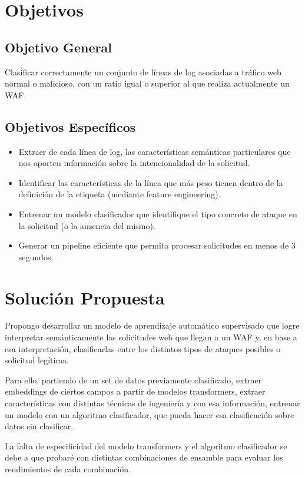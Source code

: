 \documentclass[12pt]{article}
\begin{document}
\section{Objetivos}

\subsection{Objetivo General}
Clasificar correctamente un conjunto de líneas de log asociadas a tráfico web normal o malicioso, con un ratio igual o superior al que realiza actualmente un WAF.

\subsection{Objetivos Específicos}
\begin{itemize}
   \item Extraer de cada línea de log, las características semánticas particulares que nos aporten información sobre la intencionalidad de la solicitud.
   \item Identificar las características de la línea que más peso tienen dentro de la definición de la etiqueta (mediante feature engineering).
   \item Entrenar un modelo clasificador que identifique el tipo concreto de ataque en la solicitud (o la ausencia del mismo).
   \item Generar un pipeline eficiente que permita procesar solicitudes en menos de 3 segundos.
\end{itemize}


\section{Solución Propuesta}

Propongo desarrollar un modelo de aprendizaje automático supervisado que logre interpretar semánticamente las solicitudes web que llegan a un WAF y, en base a esa interpretación, clasificarlas entre los distintos tipos de ataques posibles o solicitud legítima.

Para ello, partiendo de un set de datos previamente clasificado, extraer embeddings de ciertos campos a partir de modelos transformers, extraer características con distintas técnicas de ingeniería y con esa información, entrenar un modelo con un algoritmo clasificador, que pueda hacer esa clasificación sobre datos sin clasificar.

La falta de especificidad del modelo transformers y el algoritmo clasificador se debe a que probaré con distintas combinaciones de ensamble para evaluar los rendimientos de cada combinación. 
\end{document}
